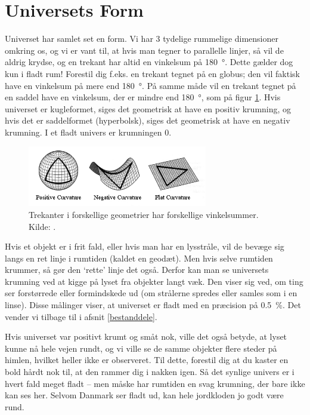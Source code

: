 \section{Universets Form}

Universet har samlet set en form. Vi har 3 tydelige rummelige dimensioner omkring os, og vi er vant til, at hvis man tegner to parallelle linjer, så vil de aldrig krydse, og en trekant har altid en vinkelsum på \SI{180}{\degree}. Dette gælder dog kun i fladt rum! Forestil dig f.eks. en trekant tegnet på en globus; den vil faktisk have en vinkelsum på mere end \SI{180}{\degree}. På samme måde vil en trekant tegnet på en saddel have en vinkelsum, der er mindre end \SI{180}{\degree}, som på figur \ref{shapes}. Hvis universet er kugleformet, siges det geometrisk at have en positiv krumning, og hvis det er saddelformet (hyperbolsk), siges det geometrisk at have en negativ krumning. I et fladt univers er krumningen 0.

\begin{figure}[h!]
	\centering
	\includegraphics[width=0.7\textwidth]{Kosmo/2017/img/universe_geometry.png}
	\caption{Trekanter i forskellige geometrier har forskellige vinkelsummer. Kilde: \cite{GeometryUniverse}.}
	\label{shapes}
\end{figure}

Hvis et objekt er i frit fald, eller hvis man har en lysstråle, vil de bevæge sig langs en ret linje i rumtiden (kaldet en geodæt). Men hvis selve rumtiden krummer, så gør den `rette' linje det også. Derfor kan man se universets krumning ved at kigge på lyset fra objekter langt væk. Den viser sig ved, om ting ser forstørrede eller formindskede ud (om strålerne spredes eller samles som i en linse). Disse målinger viser, at universet er fladt med en præcision på \SI{0.5}{\percent}. Det vender vi tilbage til i afsnit \ref{bestanddele}. %

Hvis universet var positivt krumt og småt nok, ville det også betyde, at lyset kunne nå hele vejen rundt, og vi ville se de samme objekter flere steder på himlen, hvilket heller ikke er observeret. Til dette, forestil dig at du kaster en bold hårdt nok til, at den rammer dig i nakken igen. Så det synlige univers er i hvert fald meget fladt -- men måske har rumtiden en svag krumning, der bare ikke kan ses her. Selvom Danmark ser fladt ud, kan hele jordkloden jo godt være rund.

